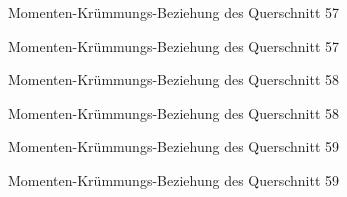 \documentclass[
  11pt,
  letterpaper,
]{scrreprt}
\begin{document}
\begin{figure}[H]


\caption{\label{fig-qs_57}Momenten-Krümmungs-Beziehung des Querschnitt
57}

\end{figure}%

\begin{figure}[H]


\caption{\label{fig-m_chi_57}Momenten-Krümmungs-Beziehung des
Querschnitt 57}

\end{figure}%

\begin{figure}[H]


\caption{\label{fig-qs_58}Momenten-Krümmungs-Beziehung des Querschnitt
58}

\end{figure}%

\begin{figure}[H]


\caption{\label{fig-m_chi_58}Momenten-Krümmungs-Beziehung des
Querschnitt 58}

\end{figure}%

\begin{figure}[H]


\caption{\label{fig-qs_59}Momenten-Krümmungs-Beziehung des Querschnitt
59}

\end{figure}%

\begin{figure}[H]


\caption{\label{fig-m_chi_59}Momenten-Krümmungs-Beziehung des
Querschnitt 59}

\end{figure}%
\end{document}

